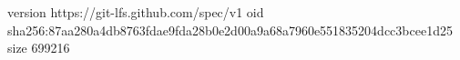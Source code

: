 version https://git-lfs.github.com/spec/v1
oid sha256:87aa280a4db8763fdae9fda28b0e2d00a9a68a7960e551835204dcc3bcee1d25
size 699216
